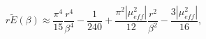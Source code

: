 \begin{equation}
r\widetilde{E}\left(\beta \right)\approx \frac{\pi ^{4}}{15}\frac{r^{4}}{\beta ^{4}}-\frac{1}{240}+\frac{\pi ^{2}\left|\mu _{eff}^{2}\right|}{12}\frac{r^{2}}{\beta ^{2}}-\frac{3\left|\mu _{eff}^{2}\right|}{16},\end{equation}

